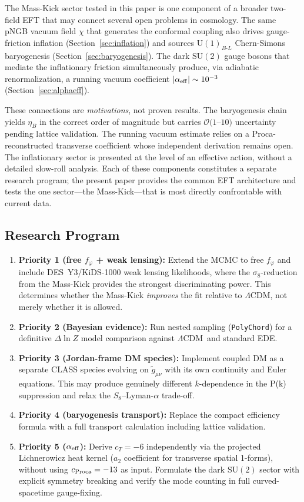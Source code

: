 \documentclass[a4paper,11pt]{article}
\newcommand{\LCDM}{$\Lambda$CDM}
\newcommand{\chif}{\chi}
\newcommand{\fphi}{f_\varphi}
\newcommand{\UBL}{\mathrm{U}(1)_{B\text{-}L}}
\newcommand{\SUt}{\mathrm{SU}(2)}
\newcommand{\etaB}{\eta_B}
\begin{document}
The Mass-Kick sector tested in this paper is one component of a broader two-field EFT that may connect several open problems in cosmology. The same pNGB vacuum field $\chif$ that generates the conformal coupling also drives gauge-friction inflation (Section~\ref{sec:inflation}) and sources $\UBL$ Chern-Simons baryogenesis (Section~\ref{sec:baryogenesis}). The dark $\SUt$ gauge bosons that mediate the inflationary friction simultaneously produce, via adiabatic renormalization, a running vacuum coefficient $|\alpha_{\rm eff}| \sim 10^{-3}$ (Section~\ref{sec:alphaeff}).

These connections are \textit{motivations}, not proven results. The baryogenesis chain yields $\etaB$ in the correct order of magnitude but carries $\mathcal{O}(1$--$10)$ uncertainty pending lattice validation. The running vacuum estimate relies on a Proca-reconstructed transverse coefficient whose independent derivation remains open. The inflationary sector is presented at the level of an effective action, without a detailed slow-roll analysis. Each of these components constitutes a separate research program; the present paper provides the common EFT architecture and tests the one sector---the Mass-Kick---that is most directly confrontable with current data.

\subsection{Research Program}

\begin{enumerate}[nosep]
\item \textbf{Priority 1 (free $\fphi$ + weak lensing):} Extend the MCMC to free $\fphi$ and include DES~Y3/KiDS-1000 weak lensing likelihoods, where the $\sigma_8$-reduction from the Mass-Kick provides the strongest discriminating power. This determines whether the Mass-Kick \textit{improves} the fit relative to \LCDM, not merely whether it is allowed.
\item \textbf{Priority 2 (Bayesian evidence):} Run nested sampling (\texttt{PolyChord}) for a definitive $\Delta\ln Z$ model comparison against \LCDM\ and standard EDE.
\item \textbf{Priority 3 (Jordan-frame DM species):} Implement coupled DM as a separate CLASS species evolving on $\tilde{g}_{\mu\nu}$ with its own continuity and Euler equations. This may produce genuinely different $k$-dependence in the P(k) suppression and relax the $S_8$--Lyman-$\alpha$ trade-off.
\item \textbf{Priority 4 (baryogenesis transport):} Replace the compact efficiency formula with a full transport calculation including lattice validation.
\item \textbf{Priority 5 ($\alpha_{\rm eff}$):} Derive $c_T = -6$ independently via the projected Lichnerowicz heat kernel ($a_2$ coefficient for transverse spatial 1-forms), without using $c_{\rm Proca} = -13$ as input. Formulate the dark $\SUt$ sector with explicit symmetry breaking and verify the mode counting in full curved-spacetime gauge-fixing.
\end{enumerate}
\end{document}
